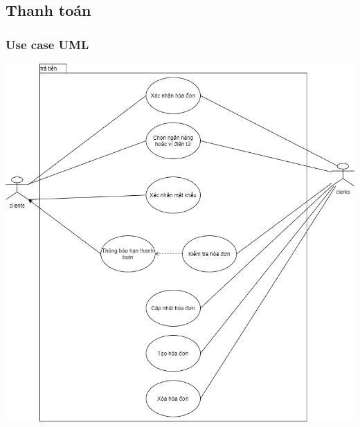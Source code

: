 \subsection{Thanh toán}
\subsubsection{Use case UML}
 \includegraphics[scale=0.6]{Images/SE_UML-payment.png}

